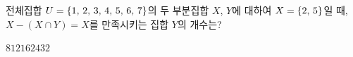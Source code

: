 전체집합 $U=\{1,\mkern3mu 2,\mkern3mu 3,\mkern3mu 4,\mkern3mu 5,\mkern3mu 6,\mkern3mu 7\}$의 두 부분집합 $X$, $Y$에 대하여 $X=\{2,\mkern3mu 5\}$일 때, $X-(X\cap Y)=X$를 만족시키는 집합 $Y$의 개수는?
\begin{choices32}{$8$}{$12$}{$16$}{$24$}{$32$}\end{choices32}
